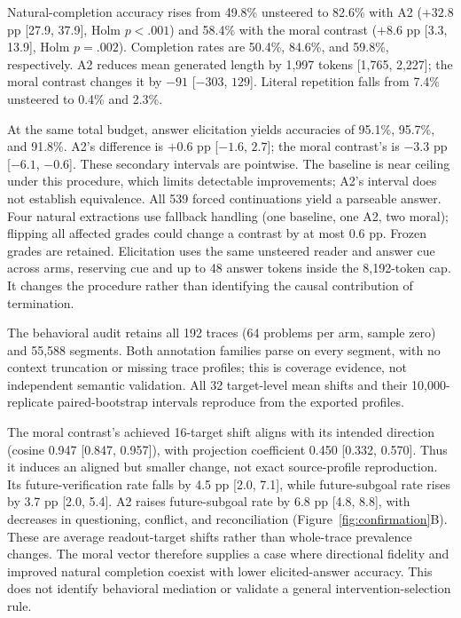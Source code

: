 Natural-completion accuracy rises from 49.8\% unsteered to 82.6\% with A2 ($+32.8$ pp [27.9, 37.9], Holm $p<.001$) and 58.4\% with the moral contrast ($+8.6$ pp [3.3, 13.9], Holm $p=.002$). Completion rates are 50.4\%, 84.6\%, and 59.8\%, respectively. A2 reduces mean generated length by 1,997 tokens [1,765, 2,227]; the moral contrast changes it by $-91$ [$-303$, $129$]. Literal repetition falls from 7.4\% unsteered to 0.4\% and 2.3\%.

At the same total budget, answer elicitation yields accuracies of 95.1\%, 95.7\%, and 91.8\%. A2's difference is $+0.6$ pp [$-1.6$, $2.7$]; the moral contrast's is $-3.3$ pp [$-6.1$, $-0.6$]. These secondary intervals are pointwise. The baseline is near ceiling under this procedure, which limits detectable improvements; A2's interval does not establish equivalence. All 539 forced continuations yield a parseable answer. Four natural extractions use fallback handling (one baseline, one A2, two moral); flipping all affected grades could change a contrast by at most 0.6 pp. Frozen grades are retained. Elicitation uses the same unsteered reader and answer cue across arms, reserving cue and up to 48 answer tokens inside the 8,192-token cap. It changes the procedure rather than identifying the causal contribution of termination.

The behavioral audit retains all 192 traces (64 problems per arm, sample zero) and 55,588 segments. Both annotation families parse on every segment, with no context truncation or missing trace profiles; this is coverage evidence, not independent semantic validation. All 32 target-level mean shifts and their 10,000-replicate paired-bootstrap intervals reproduce from the exported profiles.

The moral contrast's achieved 16-target shift aligns with its intended direction (cosine 0.947 [0.847, 0.957]), with projection coefficient 0.450 [0.332, 0.570]. Thus it induces an aligned but smaller change, not exact source-profile reproduction. Its future-verification rate falls by 4.5 pp [2.0, 7.1], while future-subgoal rate rises by 3.7 pp [2.0, 5.4]. A2 raises future-subgoal rate by 6.8 pp [4.8, 8.8], with decreases in questioning, conflict, and reconciliation (Figure~\ref{fig:confirmation}B). These are average readout-target shifts rather than whole-trace prevalence changes. The moral vector therefore supplies a case where directional fidelity and improved natural completion coexist with lower elicited-answer accuracy. This does not identify behavioral mediation or validate a general intervention-selection rule.

